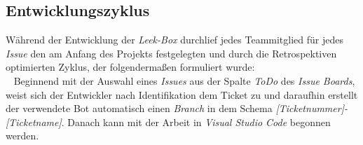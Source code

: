 \documentclass[10pt, a4paper]{article}
\begin{document}
\begin{onehalfspace}
  \subsection{Entwicklungszyklus}
    Während der Entwicklung der \textit{Leek-Box} durchlief jedes Teammitglied für jedes \textit{Issue} den am Anfang des Projekts festgelegten und
    durch die Retrospektiven optimierten Zyklus, der folgendermaßen formuliert wurde:
    \\~
    Beginnend mit der Auswahl eines \textit{Issues} aus der Spalte \textit{ToDo} des \textit{Issue Boards}, weist sich der Entwickler nach Identifikation dem Ticket zu und  daraufhin erstellt der verwendete Bot automatisch einen \textit{Branch}
    in dem Schema \textit{[Ticket\-nummer]-[Ticketname]}. Danach kann mit der Arbeit in \textit{Visual Studio Code} begonnen werden.
    \\~

\end{onehalfspace}
\end{document}
